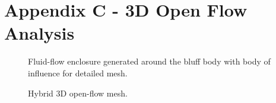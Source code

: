\newpage
\section*{Appendix C - 3D Open Flow Analysis} 

\begin{figure}[h]
    \centering
    \noindent{}
    \caption{Fluid-flow enclosure generated around the bluff body with body of influence for detailed mesh.}
    \label{fig:3D_OF_FLOWFIELD}
\end{figure}

\begin{figure}[h]
    \centering
    \noindent{}
    \caption{Hybrid 3D open-flow mesh.}
    \label{fig:3D_OF_MESH}
\end{figure}


